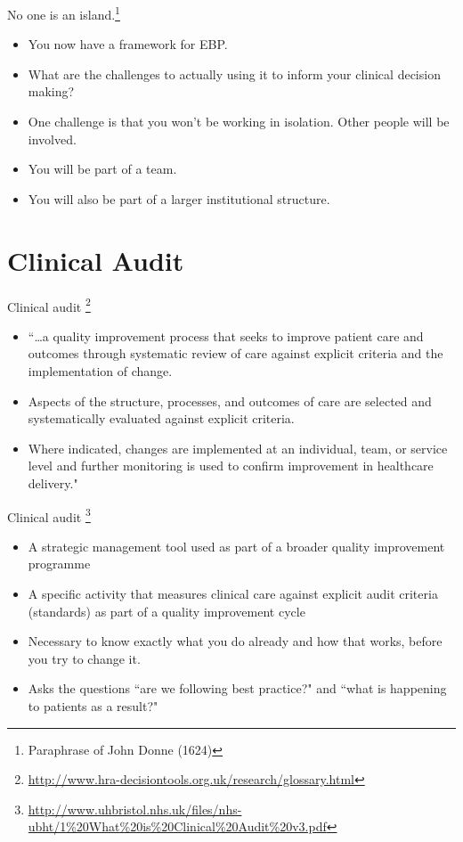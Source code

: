 \documentclass{beamer}
\begin{document}
% 
\begin{frame}{No one is an island.\footnote{\tiny{Paraphrase of John Donne (1624)}}}
	\begin{itemize}
	\item You now have a framework for EBP. 
	\item What are the challenges to actually using it to inform your clinical decision making?
	\item One challenge is that you won't be working in isolation. Other people will be involved.
	\item You will be part of a \alert{team}.
	\item You will also be part of a larger institutional structure.
	\end{itemize}
\end{frame}

\section{Clinical Audit}

%
\begin{frame}
\center{\Huge{\textcolor{darkgray}{Clinical Audit}}}
\end{frame}

% 
\begin{frame}{Clinical audit \footnote{\tiny{\url{http://www.hra-decisiontools.org.uk/research/glossary.html}}}}
	\begin{itemize}
	\item ``\dots a quality improvement process that seeks to improve patient care and outcomes through systematic review of care against explicit criteria and the implementation of change.
	\item Aspects of the structure, processes, and outcomes of care are selected and systematically evaluated against explicit criteria. 
	\item Where indicated, changes are implemented at an individual, team, or service level and further monitoring is used to confirm improvement in healthcare delivery."
	\end{itemize}
\end{frame}

% 
\begin{frame}{Clinical audit \footnote{\tiny{\url{http://www.uhbristol.nhs.uk/files/nhs-ubht/1\%20What\%20is\%20Clinical\%20Audit\%20v3.pdf}}}}
	\begin{itemize}
	\item A strategic management tool used as part of a broader quality improvement programme
	\item A specific activity that measures clinical care against explicit audit criteria (standards) as part of a quality improvement cycle 
	\item Necessary to know exactly what you do already and how that works, before you try to change it.
	\item Asks the questions ``are we following best practice?" and ``what is happening to patients as a result?" 
	\end{itemize}
\end{frame}
\end{document}
